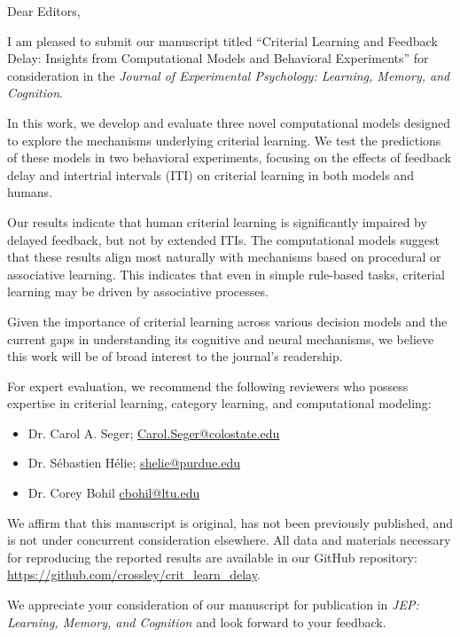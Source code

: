 \documentclass[10pt]{article}
\begin{document}
\thispagestyle{fancy}
Dear Editors,

I am pleased to submit our manuscript titled ``Criterial
Learning and Feedback Delay: Insights from Computational
Models and Behavioral Experiments'' for consideration in the
\textit{Journal of Experimental Psychology: Learning,
Memory, and Cognition}.

In this work, we develop and evaluate three novel
computational models designed to explore the mechanisms
underlying criterial learning. We test the predictions
of these models in two behavioral experiments, focusing on
the effects of feedback delay and intertrial intervals (ITI)
on criterial learning in both models and humans.

Our results indicate that human criterial learning is
significantly impaired by delayed feedback, but not by
extended ITIs. The computational models suggest that these
results align most naturally with mechanisms based on
procedural or associative learning. This indicates that
even in simple rule-based tasks, criterial learning may
be driven by associative processes.

Given the importance of criterial learning across various
decision models and the current gaps in understanding its
cognitive and neural mechanisms, we believe this work will
be of broad interest to the journal's readership.

For expert evaluation, we recommend the following reviewers
who possess expertise in criterial learning, category
learning, and computational modeling:

\begin{itemize}
    \item Dr. Carol A. Seger; \href{mailto:Carol.Seger@colostate.edu}{Carol.Seger@colostate.edu}
    \item Dr. S\'ebastien H\'elie; \href{mailto:shelie@purdue.edu}{shelie@purdue.edu}
    \item Dr. Corey Bohil \href{mailto:cbohil@ltu.edu}{cbohil@ltu.edu}
\end{itemize}

We affirm that this manuscript is original, has not been
previously published, and is not under concurrent
consideration elsewhere. All data and materials necessary
for reproducing the reported results are available in our
GitHub repository:
\url{https://github.com/crossley/crit_learn_delay}.

We appreciate your consideration of our manuscript for
publication in \textit{JEP: Learning, Memory, and Cognition}
and look forward to your feedback.
\end{document}
